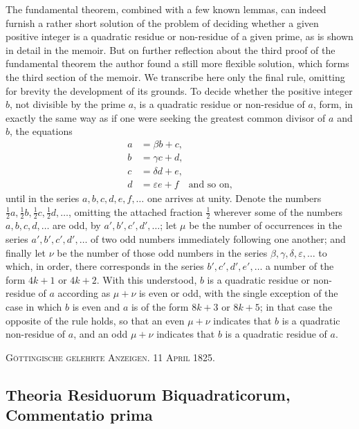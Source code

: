 \documentclass[12pt]{article}
\begin{document}
The fundamental theorem, combined with a few known lemmas, can indeed furnish a rather short solution of the problem of deciding whether a given positive integer is a quadratic residue or non-residue of a given prime, as is shown in detail in the memoir. But on further reflection about the third proof of the fundamental theorem the author found a still more flexible solution, which forms the third section of the memoir. We transcribe here only the final rule, omitting for brevity the development of its grounds. To decide whether the positive integer $b$, not divisible by the prime $a$, is a quadratic residue or non-residue of $a$, form, in exactly the same way as if one were seeking the greatest common divisor of $a$ and $b$, the equations
\[
\begin{aligned}
a&=\beta b+c,\\
b&=\gamma c+d,\\
c&=\delta d+e,\\
d&=\varepsilon e+f\quad\text{and so on,}
\end{aligned}
\]
until in the series $a,b,c,d,e,f,
\ldots$ one arrives at unity. Denote the numbers $\frac12a,\frac12b,\frac12c,\frac12d,
\ldots$, omitting the attached fraction $\frac12$ wherever some of the numbers $a,b,c,d,
\ldots$ are odd, by $a',b',c',d',
\ldots$; let $\mu$ be the number of occurrences in the series $a',b',c',d',
\ldots$ of two odd numbers immediately following one another; and finally let $\nu$ be the number of those odd numbers in the series $\beta,\gamma,\delta,\varepsilon,
\ldots$ to which, in order, there corresponds in the series $b',c',d',e',
\ldots$ a number of the form $4k+1$ or $4k+2$. With this understood, $b$ is a quadratic residue or non-residue of $a$ according as $\mu+\nu$ is even or odd, with the single exception of the case in which $b$ is even and $a$ is of the form $8k+3$ or $8k+5$; in that case the opposite of the rule holds, so that an even $\mu+\nu$ indicates that $b$ is a quadratic non-residue of $a$, and an odd $\mu+\nu$ indicates that $b$ is a quadratic residue of $a$.

\begin{center}
\textsc{Göttingische gelehrte Anzeigen. 11 April 1825.}
\end{center}

\subsection*{Theoria Residuorum Biquadraticorum, Commentatio prima}
\end{document}
